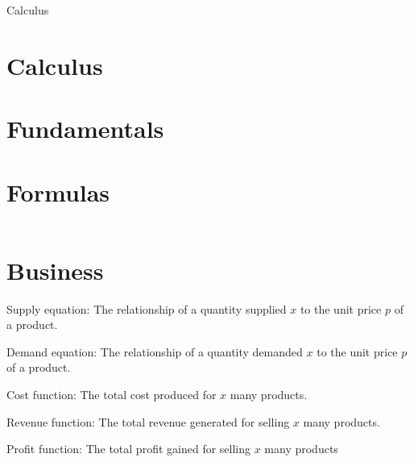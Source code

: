 \documentclass{article}
\begin{document}
\begin{titlepage}
    \begin{center}
        \Huge Calculus
    \end{center}
\end{titlepage}

\newpage
\tableofcontents

\section{Calculus}

\section{Fundamentals}



\section{Formulas} %

\begin{equation*}
    
\end{equation*}

\section{Business}

Supply equation: The relationship of a quantity supplied $x$ to the unit price $p$ of a product.

Demand equation: The relationship of a quantity demanded $x$ to the unit price $p$ of a product.

Cost function: The total cost produced for $x$ many products.

Revenue function: The total revenue generated for selling $x$ many products.

Profit function: The total profit gained for selling $x$ many products
\end{document}
